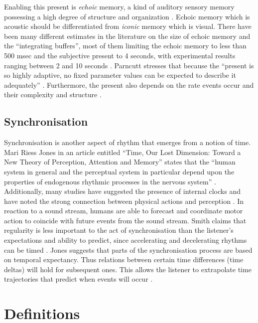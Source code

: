 Enabling this present is {\it echoic} memory, a kind of auditory
sensory memory possessing a high degree of structure and organization \cite[p. 451]{Parncutt:94}. 
Echoic memory which is acoustic should be differentiated from {\it iconic} memory which 
is visual. There have been many different estimates in the literature 
on the size of echoic memory and the ``integrating buffers'', most of 
them limiting the echoic memory to less than 500 msec and the
subjective present to 4 seconds, with experimental results ranging 
between 2 and 10 seconds \cite[p. 12-3]{Smith:99}
\cite[p. 451]{Parncutt:94}. Parncutt stresses that because the
``present is so highly adaptive, no fixed parameter values can be
expected to describe it adequately'' \cite[p. 451-2]{Parncutt:94}. 
Furthermore, the present also depends on the rate events occur and 
their complexity and structure \cite[p. 452]{Parncutt:94}.

\vspace{5mm}
\subsection{Synchronisation}

Synchronisation is another aspect of rhythm that emerges from a notion of
time. Mari Riess Jones in an article entitled ``Time, Our Lost
Dimension: Toward a New Theory of Perception, Attention and
Memory'' states that the ``human system in general and the perceptual
system in particular depend upon the properties of endogenous
rhythmic processes in the nervous system'' \cite{Jones:76}. Additionally, 
many studies have suggested the presence of internal clocks and have
noted the strong connection between physical actions and perception 
\cite[p. 17]{Smith:99}. In reaction to a sound stream, humans are able
to forecast and coordinate motor action to coincide with future events
from the sound stream. Smith claims that regularity is less important 
to the act of synchronisation than the listener's expectations and ability to
predict, since accelerating and decelerating rhythms can be
timed \cite{Smith:99}. Jones suggests that parts of the synchronisation process are
based on temporal expectancy.  Thus relations between certain 
time differences (time deltas) will hold for subsequent ones. This allows
the listener to extrapolate time trajectories that predict when events
will occur \cite{Jones:76}. 

\vspace{7mm}
\section{Definitions}
\vspace{3mm}

